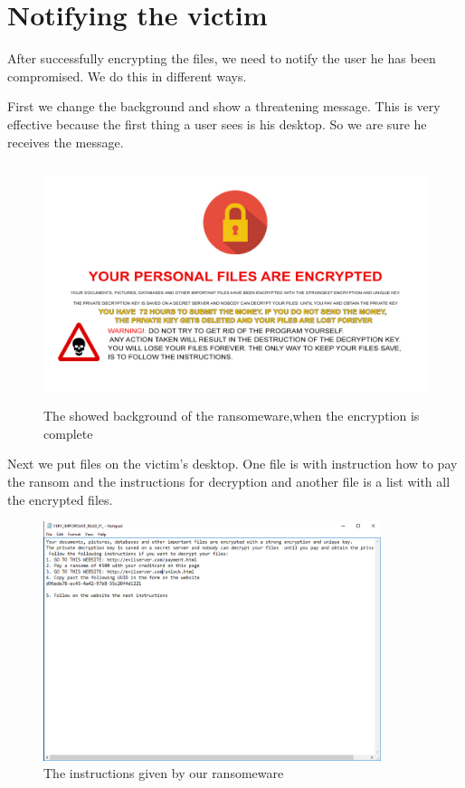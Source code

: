 \section{Notifying the victim}\label{Notifying the victim}

After successfully encrypting the files, we need to notify the user he has been compromised. We do this in different ways.

First we change the background and show a threatening message. This is very effective because the first thing a user sees is his desktop. So we are sure he receives the message.

\begin{figure}[H]
    \centering 
    \includegraphics[height=7cm]{lockscreen}
    \caption{The showed background of the ransomeware,when the encryption is complete}
    \label{lockscreen}
\end{figure}

Next we put files on the victim's desktop. One file is with instruction how to pay the ransom and the instructions for decryption and another file is a list with all the encrypted files.

\begin{figure}[H]
    \centering 
    \includegraphics[height=7cm]{instructions}
    \caption{The instructions given by our ransomeware}
    \label{instructions}
\end{figure}

